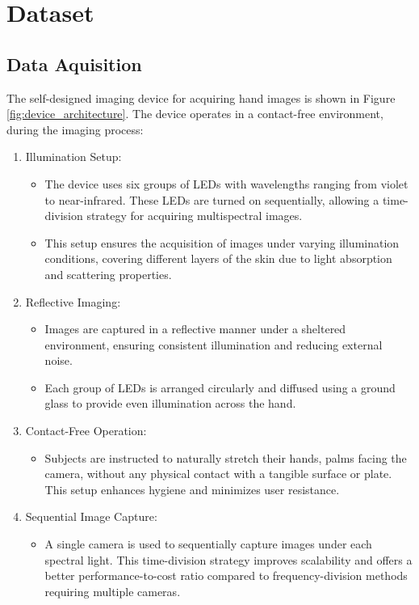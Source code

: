 \section{Dataset}

\subsection{Data Aquisition}

The self-designed imaging device for acquiring hand images \cite{hao2008multispectral,hao2007comparative} is shown in Figure \ref{fig:device_architecture}. The device operates in a contact-free environment, during the imaging process:
\begin{enumerate}
    \item Illumination Setup:
        \begin{itemize}
            \item The device uses six groups of LEDs with wavelengths ranging from violet to near-infrared. These LEDs are turned on sequentially, allowing a time-division strategy for acquiring multispectral images.
            \item This setup ensures the acquisition of images under varying illumination conditions, covering different layers of the skin due to light absorption and scattering properties.
        \end{itemize}
    \item Reflective Imaging:
        \begin{itemize}
            \item Images are captured in a reflective manner under a sheltered environment, ensuring consistent illumination and reducing external noise.
            \item Each group of LEDs is arranged circularly and diffused using a ground glass to provide even illumination across the hand.
        \end{itemize}
    \item Contact-Free Operation:
        \begin{itemize}
            \item Subjects are instructed to naturally stretch their hands, palms facing the camera, without any physical contact with a tangible surface or plate. This setup enhances hygiene and minimizes user resistance.
        \end{itemize}
    \item Sequential Image Capture:
        \begin{itemize}
            \item A single camera is used to sequentially capture images under each spectral light. This time-division strategy improves scalability and offers a better performance-to-cost ratio compared to frequency-division methods requiring multiple cameras.
        \end{itemize}
\end{enumerate}

